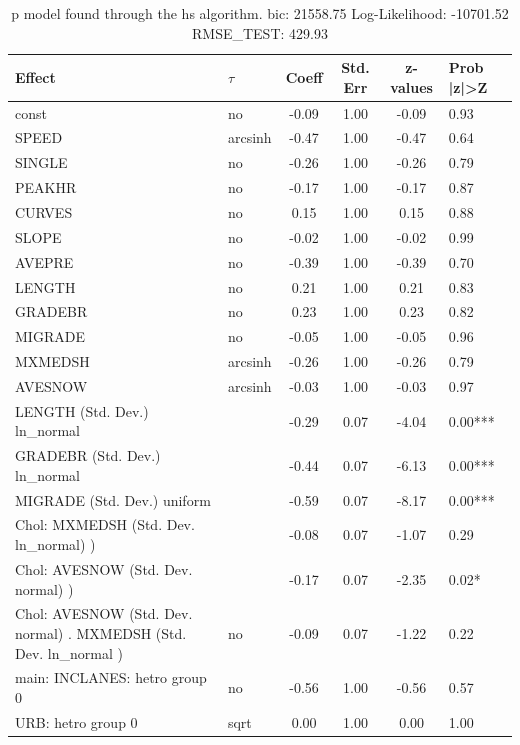 \begin{table}
	\caption{p model found through the hs algorithm. bic: 21558.75 Log-Likelihood: -10701.52 RMSE_TEST: 429.93}
	\begin{center}
		\begin{tabular}{|l|l|c|c|c|l|}
			\hline
			Effect & $\tau$ & Coeff & Std. Err & z-values & Prob |z|>Z \\
			\hline
			const & no & -0.09 & 1.00 & -0.09 & 0.93 \\
			\hline
			SPEED & arcsinh & -0.47 & 1.00 & -0.47 & 0.64 \\
			\hline
			SINGLE & no & -0.26 & 1.00 & -0.26 & 0.79 \\
			\hline
			PEAKHR & no & -0.17 & 1.00 & -0.17 & 0.87 \\
			\hline
			CURVES & no & 0.15 & 1.00 & 0.15 & 0.88 \\
			\hline
			SLOPE & no & -0.02 & 1.00 & -0.02 & 0.99 \\
			\hline
			AVEPRE & no & -0.39 & 1.00 & -0.39 & 0.70 \\
			\hline
			LENGTH & no & 0.21 & 1.00 & 0.21 & 0.83 \\
			\hline
			GRADEBR & no & 0.23 & 1.00 & 0.23 & 0.82 \\
			\hline
			MIGRADE & no & -0.05 & 1.00 & -0.05 & 0.96 \\
			\hline
			MXMEDSH & arcsinh & -0.26 & 1.00 & -0.26 & 0.79 \\
			\hline
			AVESNOW & arcsinh & -0.03 & 1.00 & -0.03 & 0.97 \\
			\hline
			LENGTH (Std. Dev.) ln_normal &  & -0.29 & 0.07 & -4.04 & 0.00*** \\
			\hline
			GRADEBR (Std. Dev.) ln_normal &  & -0.44 & 0.07 & -6.13 & 0.00*** \\
			\hline
			MIGRADE (Std. Dev.) uniform &  & -0.59 & 0.07 & -8.17 & 0.00*** \\
			\hline
			 Chol: MXMEDSH (Std. Dev. ln_normal) ) &  & -0.08 & 0.07 & -1.07 & 0.29 \\
			\hline
			 Chol: AVESNOW (Std. Dev. normal) ) &  & -0.17 & 0.07 & -2.35 & 0.02* \\
			\hline
			 Chol: AVESNOW (Std. Dev. normal) . MXMEDSH (Std. Dev.   ln_normal ) & no & -0.09 & 0.07 & -1.22 & 0.22 \\
			\hline
			main: INCLANES: hetro group 0 & no & -0.56 & 1.00 & -0.56 & 0.57 \\
			\hline
			URB: hetro group 0 & sqrt & 0.00 & 1.00 & 0.00 & 1.00 \\

\end{tabular}
\end{center}
\end{table}
